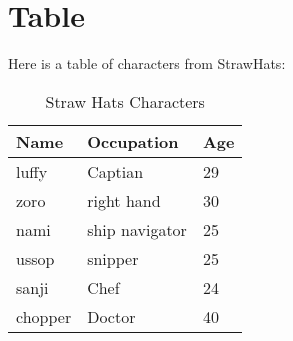 \documentclass{article}
\begin{document}
\section{Table}
Here is a table of characters from StrawHats:
\begin{table}[h]
    \caption{Straw Hats Characters}
    \begin{tabular}{@{}lll@{}}
        \toprule
        \textbf{Name} & \textbf{Occupation}      & \textbf{Age} \\ \midrule
        luffy         & Captian                     & 29           \\
        zoro       & right hand                     & 30           \\
        nami       & ship navigator                 & 25           \\
        ussop         & snipper                     & 25           \\
        sanji       & Chef                          & 24           \\ 
        chopper     & Doctor                        & 40           \\ \bottomrule
    \end{tabular}
\end{table}
\end{document}
